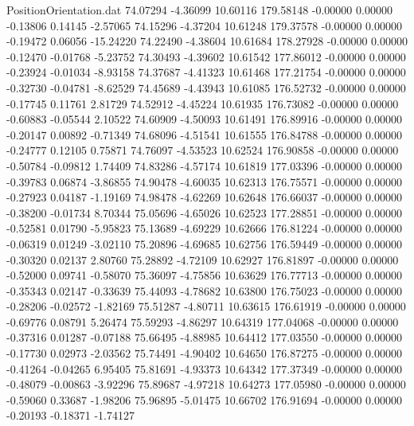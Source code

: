\begin{filecontents}{PositionOrientation.dat}
  74.07294   -4.36099   10.60116   179.58148   -0.00000    0.00000   -0.13806    0.14145   -2.57065
  74.15296   -4.37204   10.61248   179.37578   -0.00000    0.00000   -0.19472    0.06056  -15.24220
  74.22490   -4.38604   10.61684   178.27928   -0.00000    0.00000   -0.12470   -0.01768   -5.23752
  74.30493   -4.39602   10.61542   177.86012   -0.00000    0.00000   -0.23924   -0.01034   -8.93158
  74.37687   -4.41323   10.61468   177.21754   -0.00000    0.00000   -0.32730   -0.04781   -8.62529
  74.45689   -4.43943   10.61085   176.52732   -0.00000    0.00000   -0.17745    0.11761    2.81729
  74.52912   -4.45224   10.61935   176.73082   -0.00000    0.00000   -0.60883   -0.05544    2.10522
  74.60909   -4.50093   10.61491   176.89916   -0.00000    0.00000   -0.20147    0.00892   -0.71349
  74.68096   -4.51541   10.61555   176.84788   -0.00000    0.00000   -0.24777    0.12105    0.75871
  74.76097   -4.53523   10.62524   176.90858   -0.00000    0.00000   -0.50784   -0.09812    1.74409
  74.83286   -4.57174   10.61819   177.03396   -0.00000    0.00000   -0.39783    0.06874   -3.86855
  74.90478   -4.60035   10.62313   176.75571   -0.00000    0.00000   -0.27923    0.04187   -1.19169
  74.98478   -4.62269   10.62648   176.66037   -0.00000    0.00000   -0.38200   -0.01734    8.70344
  75.05696   -4.65026   10.62523   177.28851   -0.00000    0.00000   -0.52581    0.01790   -5.95823
  75.13689   -4.69229   10.62666   176.81224   -0.00000    0.00000   -0.06319    0.01249   -3.02110
  75.20896   -4.69685   10.62756   176.59449   -0.00000    0.00000   -0.30320    0.02137    2.80760
  75.28892   -4.72109   10.62927   176.81897   -0.00000    0.00000   -0.52000    0.09741   -0.58070
  75.36097   -4.75856   10.63629   176.77713   -0.00000    0.00000   -0.35343    0.02147   -0.33639
  75.44093   -4.78682   10.63800   176.75023   -0.00000    0.00000   -0.28206   -0.02572   -1.82169
  75.51287   -4.80711   10.63615   176.61919   -0.00000    0.00000   -0.69776    0.08791    5.26474
  75.59293   -4.86297   10.64319   177.04068   -0.00000    0.00000   -0.37316    0.01287   -0.07188
  75.66495   -4.88985   10.64412   177.03550   -0.00000    0.00000   -0.17730    0.02973   -2.03562
  75.74491   -4.90402   10.64650   176.87275   -0.00000    0.00000   -0.41264   -0.04265    6.95405
  75.81691   -4.93373   10.64342   177.37349   -0.00000    0.00000   -0.48079   -0.00863   -3.92296
  75.89687   -4.97218   10.64273   177.05980   -0.00000    0.00000   -0.59060    0.33687   -1.98206
  75.96895   -5.01475   10.66702   176.91694   -0.00000    0.00000   -0.20193   -0.18371   -1.74127

\end{filecontents}
